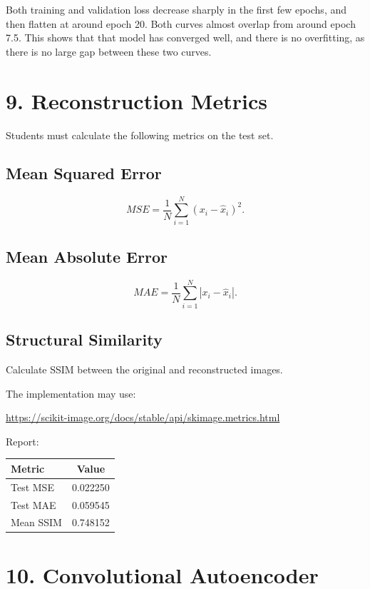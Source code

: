 \documentclass[10pt]{article}
\begin{document}
Both training and validation loss decrease sharply in the first few epochs, and then flatten at around epoch 20. Both curves almost overlap from around epoch 7.5. This shows that that model has converged well, and there is no overfitting, as there is no large gap between these two curves.

\section*{9. Reconstruction Metrics}

Students must calculate the following metrics on the test set.

\subsection*{Mean Squared Error}

\[
MSE=
\frac{1}{N}
\sum_{i=1}^{N}
(x_i-\hat{x}_i)^2.
\]

\subsection*{Mean Absolute Error}

\[
MAE=
\frac{1}{N}
\sum_{i=1}^{N}
|x_i-\hat{x}_i|.
\]

\subsection*{Structural Similarity}

Calculate SSIM between the original and reconstructed images.

The implementation may use:

\url{https://scikit-image.org/docs/stable/api/skimage.metrics.html}

Report:

\begin{center}
\begin{tabular}{|l|c|}
\hline
Metric & Value\\
\hline
Test MSE & 0.022250\\
Test MAE & 0.059545\\
Mean SSIM & 0.748152\\
\hline
\end{tabular}
\end{center}

\section*{10. Convolutional Autoencoder}
\end{document}
